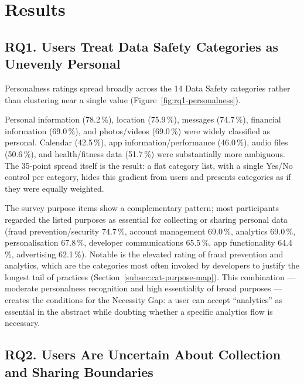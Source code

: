 \documentclass[11pt,a4paper]{article}
\makeatletter
\let\@oldsection\section
\renewcommand{\section}{\FloatBarrier\@oldsection}
\makeatother
\begin{document}
\section{Results}
\label{sec:results}

\subsection{RQ1. Users Treat Data Safety Categories as Unevenly Personal}
\label{subsec:rq1-personalness}

Personalness ratings spread broadly across the 14 Data Safety categories
rather than clustering near a single value
(Figure~\ref{fig:rq1-personalness}).



\noindent Personal information (78.2\,\%),
location (75.9\,\%), messages (74.7\,\%), financial information
(69.0\,\%), and photos/videos (69.0\,\%) were widely classified as
personal. Calendar (42.5\,\%), app information/performance (46.0\,\%),
audio files (50.6\,\%), and health/fitness data (51.7\,\%) were
substantially more ambiguous. The 35-point spread itself is the result:
a flat category list, with a single Yes/No control per category, hides
this gradient from users and presents categories as if they were
equally weighted.

The survey purpose items show a complementary pattern; most participants
regarded the listed purposes as essential for collecting or sharing
personal data (fraud prevention/security 74.7\,\%, account management
69.0\,\%, analytics 69.0\,\%, personalisation 67.8\,\%, developer
communications 65.5\,\%, app functionality 64.4\,\%, advertising
62.1\,\%). Notable is the elevated rating of fraud prevention and
analytics, which are the categories most often invoked by developers to
justify the longest tail of practices (Section~\ref{subsec:cat-purpose-map}).
This combination --- moderate personalness recognition and high
essentiality of broad purposes --- creates the conditions for the
Necessity Gap: a user can accept ``analytics'' as essential in the
abstract while doubting whether a specific analytics flow is necessary.

\subsection{RQ2. Users Are Uncertain About Collection and Sharing Boundaries}
\label{subsec:rq2-boundaries}
\end{document}
